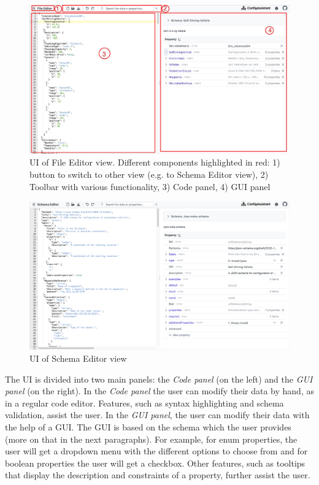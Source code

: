 \begin{figure}
    \includegraphics[width=\textwidth]{figures/fileeditor}
    \caption{UI of File Editor view. Different components highlighted in red: 1) button to switch to other view (e.g. to Schema Editor view), 2) Toolbar with various functionality, 3) Code panel, 4) GUI panel}
    \label{fig:fileeditor}
\end{figure}

\begin{figure}
    \includegraphics[width=\textwidth]{figures/schemaeditor}
    \caption{UI of Schema Editor view}
    \label{fig:schemaeditor}
\end{figure}


The UI is divided into two main panels: the  \textit{Code panel} (on the left) and the \textit{GUI panel} (on the right).
In the \textit{Code panel} the user can modify their data by hand, as in a regular code editor.
Features, such as syntax highlighting and schema validation, assist the user.
In the \textit{GUI panel}, the user can modify their data with the help of a GUI.
The GUI is based on the schema which the user provides (more on that in the next paragraphs).
For example, for enum properties, the user will get a dropdown menu with the different options to choose from and for boolean properties the user will get a checkbox.
Other features, such as tooltips that display the description and constraints of a property, further assist the user.

